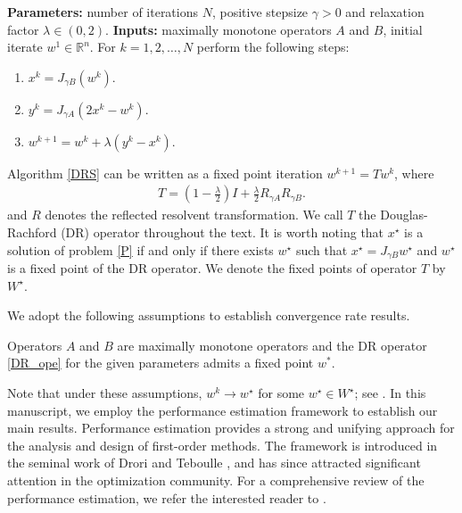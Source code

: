 \documentclass[ijoc,sglanonrev]{informs4}
\begin{document}
\begin{algorithm}
\caption{The Douglas-Rachford splitting method}
\begin{algorithmic}
\State \textbf{Parameters:} number of iterations $N$,  positive stepsize $\gamma>0$ and relaxation factor $\lambda\in (0, 2)$.
\State \textbf{Inputs:} maximally monotone operators $A$ and $B$, initial iterate $w^1 \in \mathbb{R}^n$.
\State For $k=1, 2, \ldots, N$ perform the following steps:\\
\begin{enumerate}[label=\roman*)]
\item 
$x^k = J_{\gamma B}(w^k)$.
\item
$y^k = J_{\gamma A}(2x^k - w^k)$.
\item
$w^{k+1} = w^k + \lambda (y^k - x^k)$.
\end{enumerate}
\end{algorithmic}
\label{DRS}
\end{algorithm}

Algorithm \ref{DRS} can be written as a fixed point iteration $w^{k+1}=Tw^k$, where 
\begin{align}\label{DR_ope}
T=(1-\tfrac{\lambda}{2})I+\tfrac{\lambda}{2}R_{\gamma A}R_{\gamma B}.  
\end{align}
and $R$ denotes the reflected resolvent transformation. We call $T$  the Douglas-Rachford (DR) operator throughout the text. It is worth noting that $x^\star$ is a solution of problem \eqref{P}  if and only if there exists $w^\star$ such that $x^\star=J_{\gamma B}w^\star$ and $w^\star$ is a fixed point of the DR operator. We denote the fixed points of operator $T$ by $W^\star$.   

 We adopt the following assumptions to establish convergence rate results.
 
\begin{assumption}\label{assumption}
Operators $A$ and $B$ are maximally monotone operators and 
the DR operator \eqref{DR_ope} for the given parameters admits a fixed point $w^*$.
\end{assumption}


Note that under these assumptions, $w^k\to w^\star$ for some $w^\star\in W^\star$; see \cite[Theorem 26.11]{bauschke2017}. In this manuscript, we employ the performance estimation framework to establish our main results. Performance estimation provides a strong and unifying approach for the analysis and design of first-order methods. The framework is introduced in the seminal work of Drori and Teboulle \cite{drori2014performance}, and has since attracted significant attention in the optimization community. For a comprehensive review of the performance estimation, we refer the interested reader to \cite{abbaszadehpeivasti2024performance, taylor2024towards, taylor2017smooth}.
\end{document}
